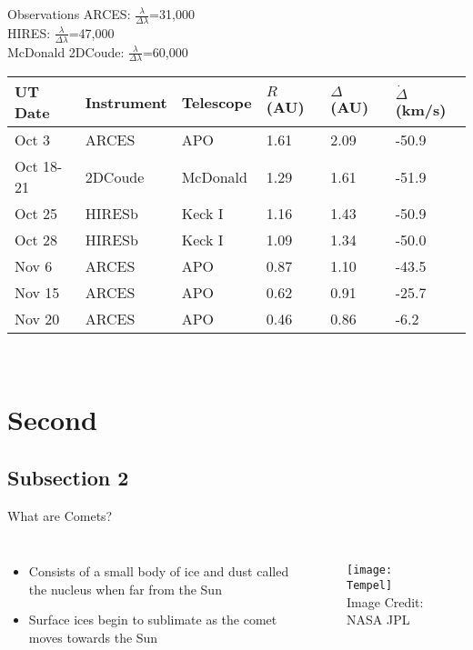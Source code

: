 \documentclass{beamer}
\begin{document}
\begin{frame}{Observations}
ARCES: $\frac{\lambda}{\Delta\lambda}$=31,000\\
HIRES: $\frac{\lambda}{\Delta\lambda}$=47,000\\
McDonald 2DCoude: $\frac{\lambda}{\Delta\lambda}$=60,000\\
\begin{block}{}
\small
\begin{tabular}{llllll} 
UT Date & Instrument & Telescope & $R$ (AU) & $\Delta$ (AU) & $\dot{\Delta}$ (km/s)\\
\hline
Oct 3 & ARCES & APO & 1.61 & 2.09 & -50.9\\
Oct 18-21 & 2DCoude & McDonald & 1.29 & 1.61 & -51.9\\
Oct 25 & HIRESb & Keck I & 1.16 & 1.43 & -50.9\\
Oct 28 & HIRESb & Keck I & 1.09 & 1.34 & -50.0\\
Nov 6 & ARCES & APO & 0.87 & 1.10 & -43.5\\
Nov 15 & ARCES & APO & 0.62 & 0.91 & -25.7\\
Nov 20 & ARCES & APO & 0.46 & 0.86 & -6.2\\
\hline
\end{tabular}\\
\end{block}
\end{frame}

\section{Second}
\subsection{Subsection 2}
\begin{frame}{What are Comets?}
\begin{columns}
\begin{itemize}
  \item Consists of a small body of ice and dust called the nucleus when far from the Sun
\item Surface ices begin to sublimate as the comet moves towards the Sun
  \end{itemize}
\begin{figure}
\texttt{[image: Tempel]}\\
\tiny{Image Credit: NASA JPL}
\end{figure}
\end{columns}
\end{frame}
\end{document}
